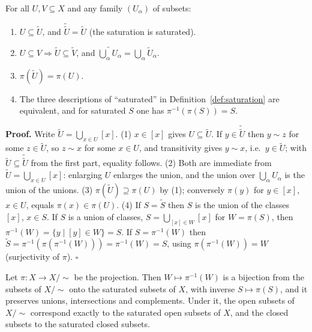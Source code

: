 \documentclass[11pt]{report}
\makeatletter
\newcounter{thmcounter}[section]
\renewenvironment{proof}[1][Proof]{\noindent\textbf{#1.} }{\hfill$\square$\par\vspace{5pt}}
\newcommand{\thmlabel}[1]{\edef\@currentlabel{\arabic{section}.\arabic{thmcounter}}\label{#1}}
\newcommand{\leeref}[1]{\par\smallskip{\raggedleft\footnotesize\textsc{Lee}:\ #1\par}}
\makeatother
\begin{document}
\begin{lembox}\thmlabel{lem:saturation}
For all $U, V \subseteq X$ and any family $(U_\alpha)$ of subsets:
\begin{enumerate}
    \item $U \subseteq \tilde U$, and $\tilde{\tilde U} = \tilde U$ (the saturation is saturated).
    \item $U \subseteq V \Rightarrow \tilde U \subseteq \tilde V$, and $\widetilde{\bigcup_\alpha U_\alpha} = \bigcup_\alpha \tilde U_\alpha$.
    \item $\pi(\tilde U) = \pi(U)$.
    \item The three descriptions of ``saturated'' in Definition~\ref{def:saturation} are equivalent, and for saturated $S$ one has $\pi^{-1}(\pi(S)) = S$.
\end{enumerate}
\end{lembox}

\begin{proof}
Write $\tilde U = \bigcup_{x \in U}[x]$. (1) $x \in [x]$ gives $U \subseteq \tilde U$. If $y \in \tilde{\tilde U}$ then $y \sim z$ for some $z \in \tilde U$, so $z \sim x$ for some $x \in U$, and transitivity gives $y \sim x$, i.e.\ $y \in \tilde U$; with $\tilde U \subseteq \tilde{\tilde U}$ from the first part, equality follows. (2) Both are immediate from $\tilde U = \bigcup_{x \in U}[x]$: enlarging $U$ enlarges the union, and the union over $\bigcup_\alpha U_\alpha$ is the union of the unions. (3) $\pi(\tilde U) \supseteq \pi(U)$ by (1); conversely $\pi(y)$ for $y \in [x]$, $x \in U$, equals $\pi(x) \in \pi(U)$. (4) If $S = \tilde S$ then $S$ is the union of the classes $[x]$, $x \in S$. If $S$ is a union of classes, $S = \bigcup_{[x] \in W}[x]$ for $W = \pi(S)$, then $\pi^{-1}(W) = \{y \mid [y] \in W\} = S$. If $S = \pi^{-1}(W)$ then $\tilde S = \pi^{-1}(\pi(\pi^{-1}(W))) = \pi^{-1}(W) = S$, using $\pi(\pi^{-1}(W)) = W$ (surjectivity of $\pi$).
\end{proof}

\begin{propbox}\thmlabel{prop:saturation-correspondence}
Let $\pi : X \to X/{\sim}$ be the projection. Then $W \mapsto \pi^{-1}(W)$ is a bijection from the subsets of $X/{\sim}$ onto the saturated subsets of $X$, with inverse $S \mapsto \pi(S)$, and it preserves unions, intersections and complements. Under it, the open subsets of $X/{\sim}$ correspond exactly to the saturated open subsets of $X$, and the closed subsets to the saturated closed subsets.
\leeref{Theorem A.27(c)}
\end{propbox}
\end{document}
